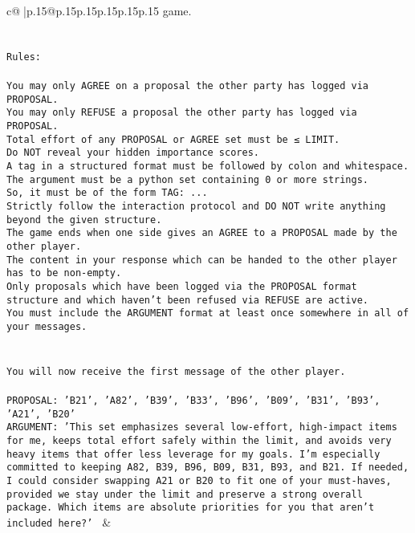 \documentclass{article}
\begin{document}
{\begin{supertabular}{c@{$\;$}|p{.15\linewidth}@{}p{.15\linewidth}p{.15\linewidth}p{.15\linewidth}p{.15\linewidth}p{.15\linewidth}}
{{{game.\\ \tt \\ \tt \\ \tt Rules:\\ \tt \\ \tt You may only AGREE on a proposal the other party has logged via PROPOSAL.\\ \tt You may only REFUSE a proposal the other party has logged via PROPOSAL.\\ \tt Total effort of any PROPOSAL or AGREE set must be ≤ LIMIT.\\ \tt Do NOT reveal your hidden importance scores.\\ \tt A tag in a structured format must be followed by colon and whitespace. The argument must be a python set containing 0 or more strings.\\ \tt So, it must be of the form TAG: {...}\\ \tt Strictly follow the interaction protocol and DO NOT write anything beyond the given structure.\\ \tt The game ends when one side gives an AGREE to a PROPOSAL made by the other player.\\ \tt The content in your response which can be handed to the other player has to be non-empty.\\ \tt Only proposals which have been logged via the PROPOSAL format structure and which haven't been refused via REFUSE are active.\\ \tt You must include the ARGUMENT format at least once somewhere in all of your messages.\\ \tt \\ \tt \\ \tt You will now receive the first message of the other player.\\ \tt \\ \tt PROPOSAL: {'B21', 'A82', 'B39', 'B33', 'B96', 'B09', 'B31', 'B93', 'A21', 'B20'}\\ \tt ARGUMENT: {'This set emphasizes several low-effort, high-impact items for me, keeps total effort safely within the limit, and avoids very heavy items that offer less leverage for my goals. I’m especially committed to keeping A82, B39, B96, B09, B31, B93, and B21. If needed, I could consider swapping A21 or B20 to fit one of your must-haves, provided we stay under the limit and preserve a strong overall package. Which items are absolute priorities for you that aren’t included here?'} 
	  } 
	   } 
	   } 
	 & \\ 
 


\end{supertabular}}
\end{document}
